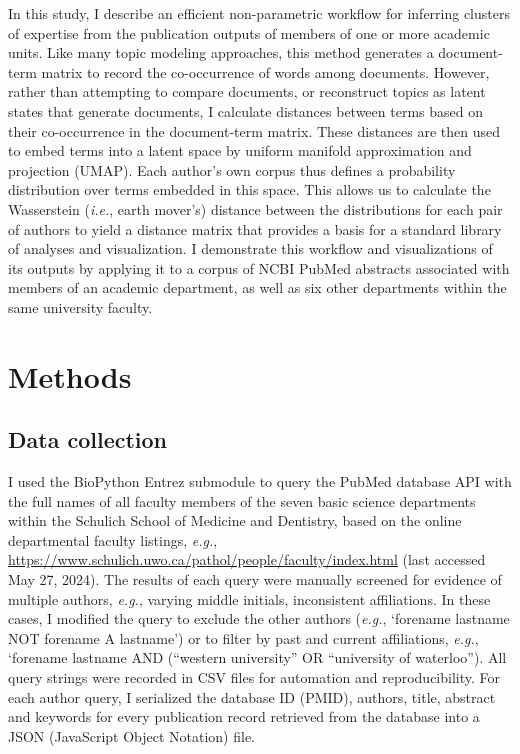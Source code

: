 \documentclass[12pt]{article}
\begin{document}


In this study, I describe an efficient non-parametric workflow for inferring clusters of expertise from the publication outputs of members of one or more academic units.
Like many topic modeling approaches, this method generates a document-term matrix to record the co-occurrence of words among documents.
However, rather than attempting to compare documents, or reconstruct topics as latent states that generate documents, I calculate distances between terms based on their co-occurrence in the document-term matrix.
These distances are then used to embed terms into a latent space by uniform manifold approximation and projection (UMAP).
Each author's own corpus thus defines a probability distribution over terms embedded in this space.
This allows us to calculate the Wasserstein (\textit{i.e.}, earth mover's) distance between the distributions for each pair of authors to yield a distance matrix that provides a basis for a standard library of analyses and visualization.
I demonstrate this workflow and visualizations of its outputs by applying it to a corpus of NCBI PubMed abstracts associated with members of an academic department, as well as six other departments within the same university faculty.



\section * {Methods}

\subsection * {Data collection}

I used the BioPython \citep{cock2009biopython} Entrez submodule to query the PubMed database API \citep{coordinators2017database} with the full names of all faculty members of the seven basic science departments within the Schulich School of Medicine and Dentistry, based on the online departmental faculty listings, \textit{e.g.},  \url{https://www.schulich.uwo.ca/pathol/people/faculty/index.html} (last accessed May 27, 2024).
The results of each query were manually screened for evidence of multiple authors, \textit{e.g.}, varying middle initials, inconsistent affiliations.
In these cases, I modified the query to exclude the other authors (\textit{e.g.}, `forename lastname NOT forename A lastname') or to filter by past and current affiliations, \textit{e.g.}, `forename lastname AND (``western university'' OR ``university of waterloo'').
All query strings were recorded in CSV files for automation and reproducibility.
For each author query, I serialized the database ID (PMID), authors, title, abstract and keywords for every publication record retrieved from the database into a JSON (JavaScript Object Notation) file.
\end{document}
